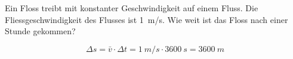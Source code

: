

\begin{aufgabe}
Ein Floss treibt mit konstanter Geschwindigkeit auf einem Fluss. Die Fliessgeschwindigkeit des Flusses ist \SI{1}{m/s}.
Wie weit ist das Floss nach einer Stunde gekommen?



\begin{loesung}
\begin{equation*}
  \Delta s = \bar{v}\cdot\Delta t=\SI{1}{m/s} \cdot \SI{3600}{s} = \SI{3600}{m}
\end{equation*}
\end{loesung}
\end{aufgabe}
